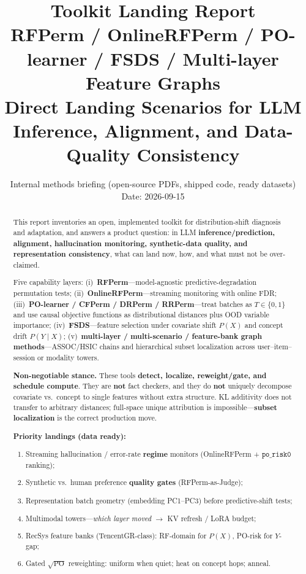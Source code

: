 \documentclass[11pt,a4paper]{article}
\title{\textbf{Toolkit Landing Report}\\[0.35em]
\large RFPerm / OnlineRFPerm / PO-learner / FSDS / Multi-layer Feature Graphs\\
Direct Landing Scenarios for LLM Inference, Alignment, and Data-Quality Consistency}
\author{Internal methods briefing (open-source PDFs, shipped code, ready datasets)\\
Date: 2026-09-15}
\date{}
\newcommand{\meth}[1]{\textbf{#1}}
\begin{document}
\maketitle
\begin{abstract}
This report inventories an open, implemented toolkit for distribution-shift diagnosis and adaptation, and answers a product question: in LLM \textbf{inference/prediction, alignment, hallucination monitoring, synthetic-data quality, and representation consistency}, what can land now, how, and what must not be over-claimed.

Five capability layers: (i)~\meth{RFPerm}---model-agnostic predictive-degradation permutation tests; (ii)~\meth{OnlineRFPerm}---streaming monitoring with online FDR; (iii)~\meth{PO-learner / CFPerm / DRPerm / RRPerm}---treat batches as \(T\in\{0,1\}\) and use causal objective functions as distributional distances plus OOD variable importance; (iv)~\meth{FSDS}---feature selection under covariate shift \(P(X)\) and concept drift \(P(Y\mid X)\); (v)~\meth{multi-layer / multi-scenario / feature-bank graph methods}---ASSOC/HSIC chains and hierarchical subset localization across user--item--session or modality towers.

\textbf{Non-negotiable stance.} These tools \textbf{detect, localize, reweight/gate, and schedule compute}. They are \textbf{not} fact checkers, and they do \textbf{not} uniquely decompose covariate vs.\ concept to single features without extra structure. KL additivity does not transfer to arbitrary distances; full-space unique attribution is impossible---\textbf{subset localization} is the correct production move.

\textbf{Priority landings (data ready):}
\begin{enumerate}
  \item Streaming hallucination / error-rate \textbf{regime} monitors (OnlineRFPerm + \(\texttt{po\_risk0}\) ranking);
  \item Synthetic vs.\ human preference \textbf{quality gates} (RFPerm-as-Judge);
  \item Representation batch geometry (embedding PC1--PC3) before predictive-shift tests;
  \item Multimodal towers---\emph{which layer moved} \(\to\) KV refresh / LoRA budget;
  \item RecSys feature banks (TencentGR-class): RF-domain for \(P(X)\), PO-risk for \(Y\)-gap;
  \item Gated \(\sqrt{\mathrm{PO}}\) reweighting: uniform when quiet; heat on concept hops; anneal.
\end{enumerate}
\end{abstract}
\end{document}
